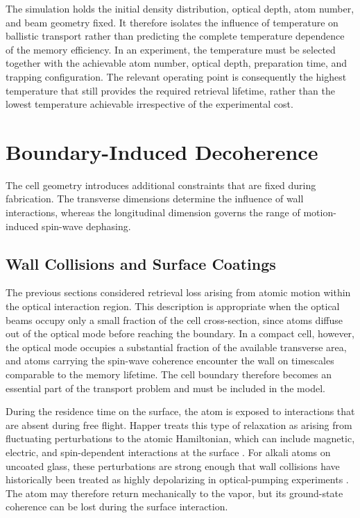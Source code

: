 The simulation holds the initial density distribution, optical depth, atom number, and beam geometry fixed. It therefore isolates the influence of temperature on ballistic transport rather than predicting the complete temperature dependence of the memory efficiency. In an experiment, the temperature must be selected together with the achievable atom number, optical depth, preparation time, and trapping configuration. The relevant operating point is consequently the highest temperature that still provides the required retrieval lifetime, rather than the lowest temperature achievable irrespective of the experimental cost.

\section{Boundary-Induced Decoherence}
\label{sec:coatings}

The cell geometry introduces additional constraints that are fixed during fabrication. The transverse dimensions determine the influence of wall interactions, whereas the longitudinal dimension governs the range of motion-induced spin-wave dephasing.

\subsection{Wall Collisions and Surface Coatings}

The previous sections considered retrieval loss arising from atomic motion within the optical interaction region. This description is appropriate when the optical beams occupy only a small fraction of the cell cross-section, since atoms diffuse out of the optical mode before reaching the boundary. In a compact cell, however, the optical mode occupies a substantial fraction of the available transverse area, and atoms carrying the spin-wave coherence encounter the wall on timescales comparable to the memory lifetime. The cell boundary therefore becomes an essential part of the transport problem and must be included in the model.

During the residence time on the surface, the atom is exposed to interactions that are absent during free flight. Happer treats this type of relaxation as arising from fluctuating perturbations to the atomic Hamiltonian, which can include magnetic, electric, and spin-dependent interactions at the surface \cite{OP_Happer_1972}. For alkali atoms on uncoated glass, these perturbations are strong enough that wall collisions have historically been treated as highly depolarizing in optical-pumping experiments \cite{OP_Happer_1972}. The atom may therefore return mechanically to the vapor, but its ground-state coherence can be lost during the surface interaction.

